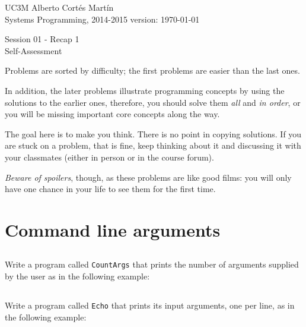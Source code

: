 \documentclass[a4paper, 12pt]{article}
\newcommand{\realtitle}{Session 01 - Recap 1}
\begin{document}
\makebox[\linewidth]{\rule{\textwidth}{0.4pt}}
UC3M \hfill Alberto Cortés Martín\\
Systems Programming, 2014-2015 \hfill version: \today\\
\makebox[\linewidth]{\rule{\textwidth}{0.4pt}}
\begin{center}
  \Large{\realtitle}\\Self-Assessment
\end{center}
\makebox[\linewidth]{\rule{\textwidth}{0.4pt}}
\vspace{1cm}

Problems are sorted by difficulty; the first problems are easier than the last
ones.

In addition, the later problems illustrate programming concepts by using the
solutions to the earlier ones, therefore, you should solve them \emph{all} and
\emph{in order}, or you will be missing important core concepts along the way.

The goal here is to make you think. There is no point in copying solutions.  If
you are stuck on a problem, that is fine, keep thinking about it and discussing
it with your classmates (either in person or in the course forum).

\emph{Beware of spoilers}, though, as these problems are like good films: you
will only have one chance in your life to see them for the first time.

\section{Command line arguments}

\subsection{}

Write a program called \texttt{CountArgs} that prints the number of arguments
supplied by the user as in the following example:



\subsection{}

Write a program called \texttt{Echo} that prints its input arguments, one per
line, as in the following example:
\end{document}
